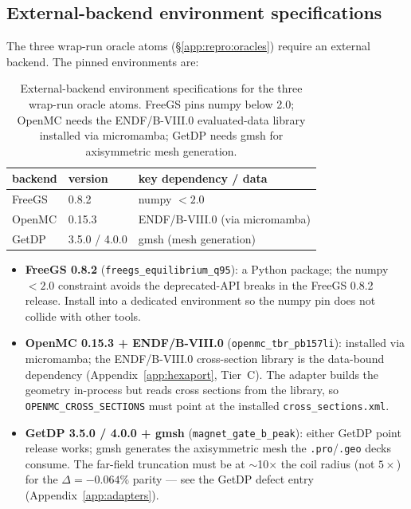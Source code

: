 \subsection{External-backend environment specifications}
\label{app:repro:env}

The three wrap-run oracle atoms (\S\ref{app:repro:oracles}) require an
external backend. The pinned environments are:

\begin{table}[h]
\centering
\small
\begin{tabular}{lll}
\toprule
backend & version & key dependency / data \\
\midrule
FreeGS & 0.8.2 & numpy $<\!2.0$ \\
OpenMC & 0.15.3 & ENDF/B-VIII.0 (via micromamba) \\
GetDP  & 3.5.0 / 4.0.0 & gmsh (mesh generation) \\
\bottomrule
\end{tabular}
\caption{External-backend environment specifications for the three
wrap-run oracle atoms. FreeGS pins numpy below 2.0; OpenMC needs the
ENDF/B-VIII.0 evaluated-data library installed via micromamba; GetDP
needs gmsh for axisymmetric mesh generation.}
\label{tab:app:repro:env}
\end{table}

\begin{itemize}\itemsep0.2em
\item \textbf{FreeGS 0.8.2} (\verb|freegs_equilibrium_q95|): a Python
package; the numpy~$<\!2.0$ constraint avoids the deprecated-API breaks
in the FreeGS 0.8.2 release. Install into a dedicated environment so the
numpy pin does not collide with other tools.
\item \textbf{OpenMC 0.15.3 + ENDF/B-VIII.0}
(\verb|openmc_tbr_pb157li|): installed via micromamba; the ENDF/B-VIII.0
cross-section library is the data-bound dependency
(Appendix~\ref{app:hexaport}, Tier~C). The adapter builds the geometry
in-process but reads cross sections from the library, so
\verb|OPENMC_CROSS_SECTIONS| must point at the installed
\texttt{cross\_sections.xml}.
\item \textbf{GetDP 3.5.0 / 4.0.0 + gmsh} (\verb|magnet_gate_b_peak|):
either GetDP point release works; gmsh generates the axisymmetric mesh
the \texttt{.pro}/\texttt{.geo} decks consume. The far-field truncation
must be at $\sim$10$\times$ the coil radius (not $5\times$) for the
$\Delta=-0.064\%$ parity --- see the GetDP defect entry
(Appendix~\ref{app:adapters}).
\end{itemize}

